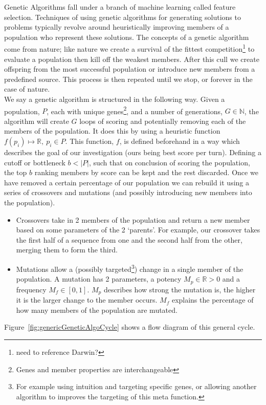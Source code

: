 Genetic Algorithms fall under a branch of machine learning called feature selection.
Techniques of using genetic algorithms for generating solutions to problems typically revolve around heuristically improving members of a population who represent these solutions.
The concepts of a genetic algorithm come from nature;
like nature we create a survival of the fittest competition\footnote{need to reference Darwin?} to evaluate a population then kill off the weakest members.
After this cull we create offspring from the most successful population or introduce new members from a predefined source.
This process is then repeated until we stop, or forever in the case of nature.\\

We say a genetic algorithm is structured in the following way.
Given a population, \(P\), each with unique genes\footnote{Genes and member properties are interchangeable}, and a number of generations, \(G\in \mathbb{N}\), the algorithm will create \(G\) loops of scoring and potentially removing each of the members of the population.
It does this by using a heuristic function \(f(p_i)\mapsto \mathbb{R},\ p_i \in P\).
This function, \(f\), is defined beforehand in a way which describes the goal of our investigation (ours being best score per turn).
Defining a cutoff or bottleneck \(b<|P|\), such that on conclusion of scoring the population, the top \(b\) ranking members by score can be kept and the rest discarded.
Once we have removed a certain percentage of our population we can rebuild it using a series of crossovers and mutations (and possibly introducing new members into the population).
\begin{itemize}
    \item Crossovers take in 2 members of the population and return a new member based on some parameters of the 2 `parents'.
    For example, our crossover takes the first half of a sequence from one and the second half from the other, merging them to form the third.
    \item Mutations allow a (possibly targeted\footnote{For example using intuition and targeting specific genes, or allowing another algorithm to improves the targeting of this meta function.}) change in a single member of the population.
    A mutation has 2 parameters, a potency \(M_p\in \mathbb{R}>0\) and a frequency \(M_f\in [0,1]\).
    \(M_p\) describes how strong the mutation is, the higher it is the larger change to the member occurs.
    \(M_f\) explains the percentage of how many members of the population are mutated.
\end{itemize}
Figure~\ref{fig:genericGeneticAlgoCycle} shows a flow diagram of this general cycle.\\

